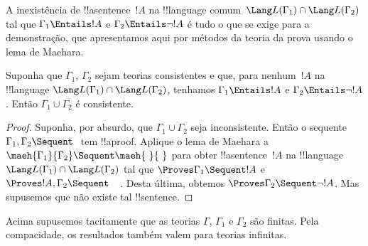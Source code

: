 \documentclass[../../../include/open-logic-section]{subfiles}
\begin{document}
A inexistência de !!a{sentence}~$!A$ na !!{language} comum~$\Lang
L(\Gamma_1) \cap \Lang L(\Gamma_2)$ tal que $\Gamma_1 \Entails !A$ e
$\Gamma_2 \Entails \lnot !A$ é tudo o que se exige para a demonstração,
que apresentamos aqui por métodos da teoria da prova usando o lema de
Maehara.

\begin{thm}
Suponha que $\Gamma_1$, $\Gamma_2$ sejam teorias consistentes e que, para
nenhum~$!A$ na !!{language} $\Lang L(\Gamma_1) \cap \Lang L(\Gamma_2)$,
tenhamos $\Gamma_1 \Entails !A$ e $\Gamma_2 \Entails \lnot !A$. Então
$\Gamma_1 \cup \Gamma_2$ é consistente.
\end{thm}

\begin{proof}
  Suponha, por absurdo, que $\Gamma_1 \cup \Gamma_2$ seja inconsistente.
  Então o sequente $\Gamma_1, \Gamma_2 \Sequent \ $ tem !!a{proof}.
  Aplique o lema de Maehara a $\maeh{\Gamma_1}{\Gamma_2} \Sequent
  \maeh{\ }{\ }$ para obter !!a{sentence}~$!A$ na !!{language}~$\Lang
  L(\Gamma_1) \cap \Lang L(\Gamma_2)$ tal que $\Proves \Gamma_1
  \Sequent !A$ e $\Proves !A, \Gamma_2 \Sequent \quad$. Desta última,
  obtemos $\Proves \Gamma_2 \Sequent \lnot !A$. Mas supusemos que não
  existe tal !!{sentence}.
\end{proof}

Acima supusemos tacitamente que as teorias $\Gamma$, $\Gamma_1$ e
$\Gamma_2$ são finitas. Pela compacidade, os resultados também valem
para teorias infinitas.
\end{document}
